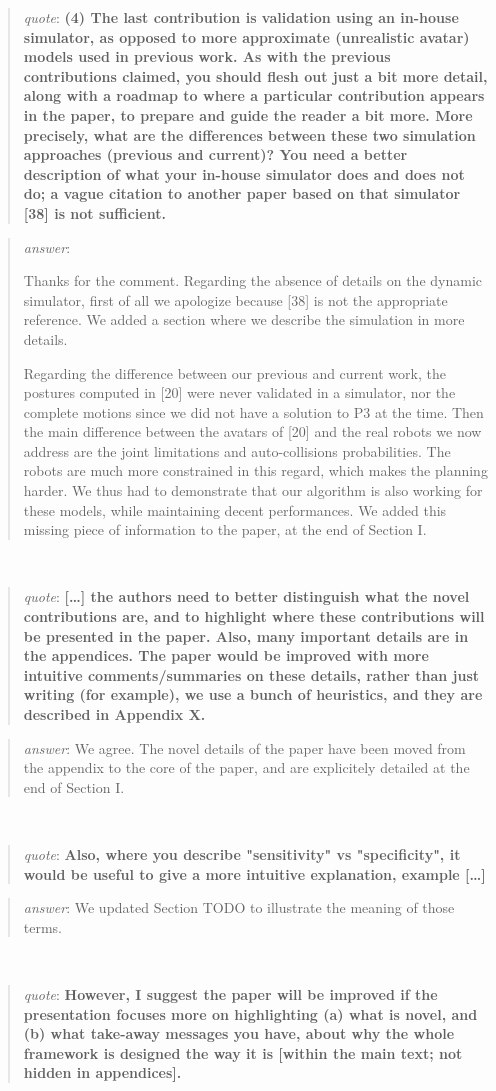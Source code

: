\documentclass[a4paper]{article}
\newcommand\quot[1]{\begin{quote} \textit{quote}: \textbf{#1}\end{quote}}
\newcommand\as[1]{\begin{quote} \textit{answer}: {#1}\end{quote} \leavevmode \\ }
\begin{document}
\quot{
(4)	The last contribution is validation using an in-house
simulator, as opposed to more approximate (unrealistic avatar) models
used in previous work.	As with the previous contributions claimed, you
should flesh out just a bit more detail, along with a roadmap to where
a particular contribution appears in the paper, to prepare and guide
the reader a bit more. More precisely, what are the differences between
these two simulation approaches (previous and current)? You need a
better description of what your in-house simulator does and does not
do; a vague citation to another paper based on that simulator [38] is
not sufficient.}

\as{Thanks for the comment. Regarding the absence of details on the dynamic simulator, first of all we apologize because [38] is not the appropriate reference.
We added a section where we describe the simulation in more details. 

Regarding the difference between our previous and current work, the postures computed in [20] were never validated in a simulator, nor the complete motions since 
we did not have a solution to P3 at the time. Then the main
difference between the avatars of [20] and the real robots we now address are the joint limitations and auto-collisions probabilities.
The robots are much more constrained in this regard, which makes the planning harder. We thus had to demonstrate that our algorithm is also working
for these models, while maintaining decent performances.
We added this missing piece of information to the paper, at the end of Section I.}


\quot{[\dots] the authors need to better
distinguish what the novel contributions are, and to highlight where
these contributions will be presented in the paper.  Also, many
important details are in the appendices. The paper would be improved
with more intuitive comments/summaries on these details, rather than
just writing (for example), we use a bunch of heuristics, and they are
described in Appendix X.}

\as{We agree. The novel details of the paper have been moved from the appendix to the core of the paper, and are explicitely detailed at the end of Section I.}

\quot{
Also, where you describe "sensitivity" vs "specificity", it would be
useful to give a more intuitive explanation, example [\dots]}

\as{We updated Section TODO to illustrate the meaning of those terms.}

\quot{
However, I suggest the paper will be improved if
the presentation focuses more on highlighting (a) what is novel, and
(b)
what take-away messages you have, about why the whole framework is
designed the way it is [within the main text; not hidden in
appendices].}
\end{document}
